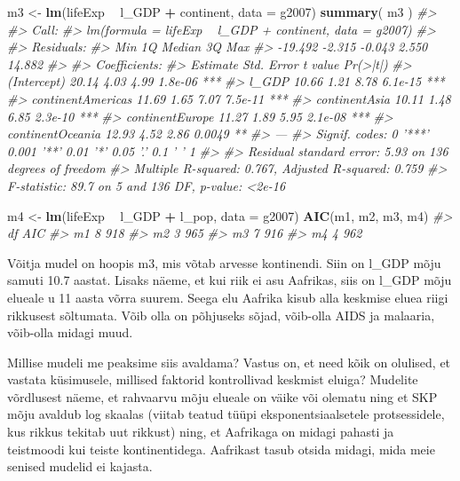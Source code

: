 \documentclass[]{book}
\newenvironment{Shaded}{\begin{snugshade}}{\end{snugshade}}
\newcommand{\CommentTok}[1]{\textcolor[rgb]{0.56,0.35,0.01}{\textit{#1}}}
\newcommand{\DataTypeTok}[1]{\textcolor[rgb]{0.13,0.29,0.53}{#1}}
\newcommand{\KeywordTok}[1]{\textcolor[rgb]{0.13,0.29,0.53}{\textbf{#1}}}
\newcommand{\NormalTok}[1]{#1}
\newcommand{\OperatorTok}[1]{\textcolor[rgb]{0.81,0.36,0.00}{\textbf{#1}}}
\newcommand{\StringTok}[1]{\textcolor[rgb]{0.31,0.60,0.02}{#1}}
\begin{document}
\begin{Shaded}
\begin{Highlighting}[]
\NormalTok{m3 <-}\StringTok{ }\KeywordTok{lm}\NormalTok{(lifeExp }\OperatorTok{~}\StringTok{ }\NormalTok{l_GDP }\OperatorTok{+}\StringTok{ }\NormalTok{continent, }\DataTypeTok{data =}\NormalTok{ g2007)}
\KeywordTok{summary}\NormalTok{( m3 )}
\CommentTok{#> }
\CommentTok{#> Call:}
\CommentTok{#> lm(formula = lifeExp ~ l_GDP + continent, data = g2007)}
\CommentTok{#> }
\CommentTok{#> Residuals:}
\CommentTok{#>     Min      1Q  Median      3Q     Max }
\CommentTok{#> -19.492  -2.315  -0.043   2.550  14.882 }
\CommentTok{#> }
\CommentTok{#> Coefficients:}
\CommentTok{#>                   Estimate Std. Error t value Pr(>|t|)    }
\CommentTok{#> (Intercept)          20.14       4.03    4.99  1.8e-06 ***}
\CommentTok{#> l_GDP                10.66       1.21    8.78  6.1e-15 ***}
\CommentTok{#> continentAmericas    11.69       1.65    7.07  7.5e-11 ***}
\CommentTok{#> continentAsia        10.11       1.48    6.85  2.3e-10 ***}
\CommentTok{#> continentEurope      11.27       1.89    5.95  2.1e-08 ***}
\CommentTok{#> continentOceania     12.93       4.52    2.86   0.0049 ** }
\CommentTok{#> ---}
\CommentTok{#> Signif. codes:  0 '***' 0.001 '**' 0.01 '*' 0.05 '.' 0.1 ' ' 1}
\CommentTok{#> }
\CommentTok{#> Residual standard error: 5.93 on 136 degrees of freedom}
\CommentTok{#> Multiple R-squared:  0.767,  Adjusted R-squared:  0.759 }
\CommentTok{#> F-statistic: 89.7 on 5 and 136 DF,  p-value: <2e-16}

\NormalTok{m4 <-}\StringTok{ }\KeywordTok{lm}\NormalTok{(lifeExp }\OperatorTok{~}\StringTok{ }\NormalTok{l_GDP }\OperatorTok{+}\StringTok{ }\NormalTok{l_pop, }\DataTypeTok{data =}\NormalTok{ g2007)}
\KeywordTok{AIC}\NormalTok{(m1, m2, m3, m4)}
\CommentTok{#>    df AIC}
\CommentTok{#> m1  8 918}
\CommentTok{#> m2  3 965}
\CommentTok{#> m3  7 916}
\CommentTok{#> m4  4 962}
\end{Highlighting}
\end{Shaded}

Võitja mudel on hoopis m3, mis võtab arvesse kontinendi. Siin on l\_GDP mõju samuti 10.7 aastat. Lisaks näeme, et kui riik ei asu Aafrikas, siis on l\_GDP mõju elueale u 11 aasta võrra suurem. Seega elu Aafrika kisub alla keskmise eluea riigi rikkusest sõltumata. Võib olla on põhjuseks sõjad, võib-olla AIDS ja malaaria, võib-olla midagi muud.

Millise mudeli me peaksime siis avaldama? Vastus on, et need kõik on olulised, et vastata küsimusele, millised faktorid kontrollivad keskmist eluiga? Mudelite võrdlusest näeme, et rahvaarvu mõju elueale on väike või olematu ning et SKP mõju avaldub log skaalas (viitab teatud tüüpi eksponentsiaalsetele protsessidele, kus rikkus tekitab uut rikkust) ning, et Aafrikaga on midagi pahasti ja teistmoodi kui teiste kontinentidega. Aafrikast tasub otsida midagi, mida meie senised mudelid ei kajasta.
\end{document}
